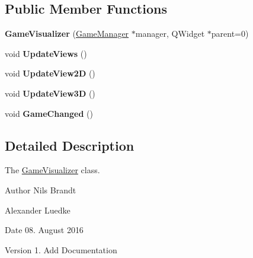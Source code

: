 \subsection*{Public Member Functions}
\begin{DoxyCompactItemize}
\item 
\hypertarget{classGameVisualizer_ac6e640e1cfa0162d63158670741d9485}{{\bfseries Game\-Visualizer} (\hyperlink{classGameManager}{Game\-Manager} $\ast$manager, Q\-Widget $\ast$parent=0)}\label{classGameVisualizer_ac6e640e1cfa0162d63158670741d9485}

\item 
\hypertarget{classGameVisualizer_ac68aa47882b34f28427e3e161f677f9d}{void {\bfseries Update\-Views} ()}\label{classGameVisualizer_ac68aa47882b34f28427e3e161f677f9d}

\item 
\hypertarget{classGameVisualizer_a5fb41e30e67173d36f3769d804130b19}{void {\bfseries Update\-View2\-D} ()}\label{classGameVisualizer_a5fb41e30e67173d36f3769d804130b19}

\item 
\hypertarget{classGameVisualizer_aee1fac4e1657fb4be1fa61f563b02d32}{void {\bfseries Update\-View3\-D} ()}\label{classGameVisualizer_aee1fac4e1657fb4be1fa61f563b02d32}

\item 
\hypertarget{classGameVisualizer_a3a8cf6d067d4d0272c1b3b60f44f8d1c}{void {\bfseries Game\-Changed} ()}\label{classGameVisualizer_a3a8cf6d067d4d0272c1b3b60f44f8d1c}

\end{DoxyCompactItemize}


\subsection{Detailed Description}
The \hyperlink{classGameVisualizer}{Game\-Visualizer} class. 

\begin{DoxyAuthor}{Author}
Nils Brandt 

Alexander Luedke
\end{DoxyAuthor}
\begin{DoxyDate}{Date}
08. August 2016
\end{DoxyDate}
\begin{DoxyVersion}{Version}
1. Add Documentation 
\end{DoxyVersion}
